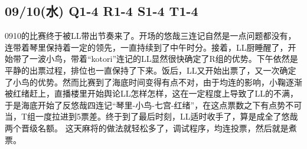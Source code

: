 \subsection{09/10(水) Q1-4 R1-4 S1-4 T1-4}


0910的比赛终于被LL带出节奏来了。开场的悠哉三连记自然是一点问题都没有，连带着琴里保持着一定的领先，一直持续到了中午时分。接着，LL厨睡醒了，开始带了一波小鸟，带着“kotori”连记的LL显然很快确定了R组的优势。下午依然是平静的出票过程，排位也一直保持了下来。饭后，LL又开始出票了，又一次确定了小鸟的优势。然而比赛到了海底时间变得有点不对，由于均连的影响，小鞠逐渐被红绪赶上，直播楼里开始舆论LL怎样怎样，这在一定程度上导致了LL的不满，于是海底开始了反悠哉四连记“琴里-小鸟-七宫-红绪”，在这点票数之下有点势不可当，T组一度拉进到5票差。终于到了最后时刻，LL适时收手了，算是成全了悠哉两个晋级名额。
这天麻将的做法就轻松多了，调试程序，均连投票，然后就是煮票。

